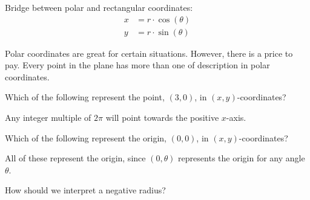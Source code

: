 \documentclass{ximera}
\begin{document}
Bridge between polar and rectangular coordinates:
\begin{align*}
    x &= r\cdot \cos(\theta)\\
    y &= r\cdot \sin(\theta)
\end{align*}



















Polar coordinates are great for certain situations. However, there is
a price to pay. Every point in the plane has more than one of
description in polar coordinates.





\begin{question}
  Which of the following represent the point, $(3,0)$, in
  $(x,y)$-coordinates?
  \begin{selectAll}
  \end{selectAll}
  \begin{feedback}
    Any integer multiple of $2\pi$ will point towards the positive $x$-axis.
  \end{feedback}
\end{question}





\begin{question}
  Which of the following represent the origin, $(0,0)$, in
  $(x,y)$-coordinates?
  \begin{selectAll}
  \end{selectAll}
  \begin{feedback}
    All of these represent the origin, since $(0,\theta)$ represents
    the origin for any angle $\theta$.
  \end{feedback}
\end{question}



How should we interpret a negative radius? 
\end{document}
